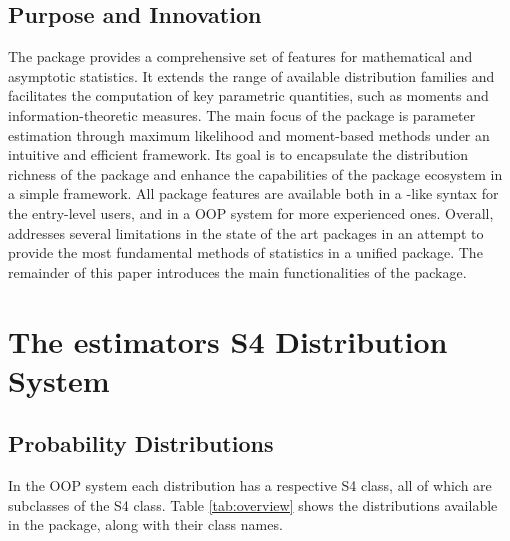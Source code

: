 \documentclass[nojss]{jss}
\begin{document}
\subsection[Purpose and Innovation]{Purpose and Innovation}\label{ss:innovation}

The  package provides a comprehensive set of features for mathematical and asymptotic statistics. It extends the range of available distribution families and facilitates the computation of key parametric quantities, such as moments and information-theoretic measures. The main focus of the package is parameter estimation through maximum likelihood and moment-based methods under an intuitive and efficient framework. Its goal is to encapsulate the distribution richness of the  package and enhance the capabilities of the  package ecosystem in a simple framework. All package features are available both in a -like syntax for the entry-level users, and in a OOP system for more experienced ones. Overall,  addresses several limitations in the state of the art  packages in an attempt to provide the most fundamental methods of statistics in a unified package. The remainder of this paper introduces the main functionalities of the package.

\section[The estimators S4 Distribution System]{The estimators S4 Distribution System} \label{s:distr}

\subsection[Probability Distributions]{Probability Distributions} \label{s:dpqr}

In the  OOP system each distribution has a respective S4 class, all of which are subclasses of the  S4 class. Table \ref{tab:overview} shows the distributions available in the package, along with their class names.
\end{document}
